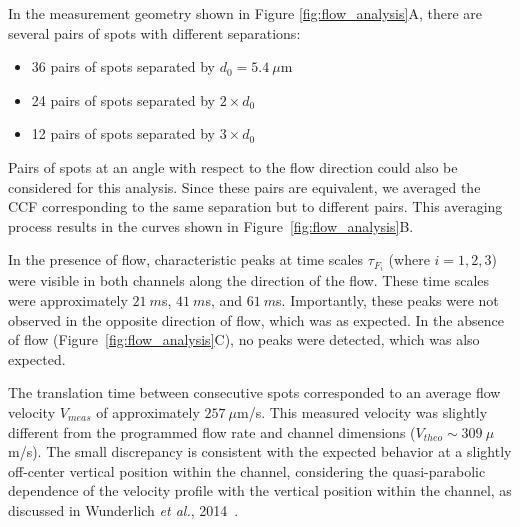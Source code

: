 In the measurement geometry shown in Figure \ref{fig:flow_analysis}A, there are several pairs of spots with different separations:

\begin{itemize}
    \item 36 pairs of spots separated by $d_0 = 5.4~\mu$m
    \item 24 pairs of spots separated by $2 \times d_0$
    \item 12 pairs of spots separated by $3 \times d_0$
\end{itemize}

Pairs of spots at an angle with respect to the flow direction could also be considered for this analysis. 
Since these pairs are equivalent, we averaged the \ac{CCF} corresponding to the same separation but to different pairs. 
This averaging process results in the curves shown in Figure~\ref{fig:flow_analysis}B.

In the presence of flow, characteristic peaks at time scales $\tau_{F_i}$ (where $i = 1, 2, 3$) were visible in both channels along the direction of the flow. 
These time scales were approximately $21~m$s, $41~m$s, and $61~m$s. Importantly, these peaks were not observed in the opposite direction of flow, which was as expected. 
In the absence of flow (Figure~\ref{fig:flow_analysis}C), no peaks were detected, which was also expected.

The translation time between consecutive spots corresponded to an average flow velocity $V_{meas}$ of approximately $257~\mu$m/s. 
This measured velocity was slightly different from the programmed flow rate and channel dimensions ($V_{theo} \sim 309~\mu$m/s). 
The small discrepancy is consistent with the expected behavior at a slightly off-center vertical position within the channel, considering the quasi-parabolic dependence of the velocity profile with the vertical position within the channel, as discussed in Wunderlich \textit{et al.}, 2014~\cite{wunderlich_LOC_2014}.

